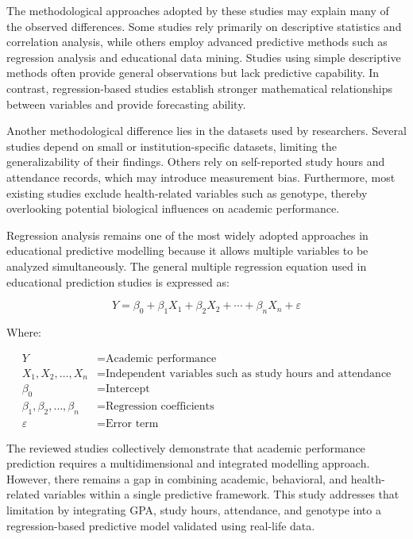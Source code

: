 \documentclass[12pt]{report}
\begin{document}
	The methodological approaches adopted by these studies may explain many of the observed differences. Some studies rely primarily on descriptive statistics and correlation analysis, while others employ advanced predictive methods such as regression analysis and educational data mining. Studies using simple descriptive methods often provide general observations but lack predictive capability. In contrast, regression-based studies establish stronger mathematical relationships between variables and provide forecasting ability.
	
	Another methodological difference lies in the datasets used by researchers. Several studies depend on small or institution-specific datasets, limiting the generalizability of their findings. Others rely on self-reported study hours and attendance records, which may introduce measurement bias. Furthermore, most existing studies exclude health-related variables such as genotype, thereby overlooking potential biological influences on academic performance.
	
	Regression analysis remains one of the most widely adopted approaches in educational predictive modelling because it allows multiple variables to be analyzed simultaneously. The general multiple regression equation used in educational prediction studies is expressed as:
	
	\[
	Y = \beta_0 + \beta_1 X_1 + \beta_2 X_2 + \cdots + \beta_n X_n + \varepsilon
	\]
	
	Where:
	
	\begin{align*}
		Y & = \text{Academic performance} \\
		X_1, X_2, \ldots, X_n & = \text{Independent variables such as study hours and attendance} \\
		\beta_0 & = \text{Intercept} \\
		\beta_1, \beta_2, \ldots, \beta_n & = \text{Regression coefficients} \\
		\varepsilon & = \text{Error term}
	\end{align*}
	
	The reviewed studies collectively demonstrate that academic performance prediction requires a multidimensional and integrated modelling approach. However, there remains a gap in combining academic, behavioral, and health-related variables within a single predictive framework. This study addresses that limitation by integrating GPA, study hours, attendance, and genotype into a regression-based predictive model validated using real-life data.
\end{document}
